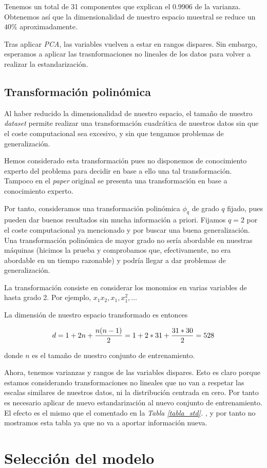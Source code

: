 \documentclass[11pt]{article}
\begin{document}
Tenemos un total de 31 componentes que explican el 0.9906 de la varianza. Obtenemos así que la dimensionalidad de nuestro espacio muestral se reduce un $40\%$ aproximadamente.

Tras aplicar \emph{PCA}, las variables vuelven a estar en rangos dispares. Sin embargo, esperamos a aplicar las trasnformaciones no lineales de los datos para volver a realizar la estandarización. 

\subsection{Transformación polinómica}


Al haber reducido la dimensionalidad de nuestro espacio, el tamaño de nuestro \emph{dataset} permite realizar una transformación cuadrática de nuestros datos sin que el coste computacional sea excesivo, y sin que tengamos problemas de generalización. 

Hemos considerado esta transformación pues no disponemos de conocimiento experto del problema para decidir en base a ello una tal transformación. Tampoco en el \emph{paper} original \cite{original_paper:paper} se presenta una transformación en base a conocimiento experto.

Por tanto, consideramos una transformación polinómica $\phi_q$ de grado $q$ fijado, pues pueden dar buenos resultados sin mucha información a priori. Fijamos $q=2$ por el coste computacional ya mencionado y por buscar una buena generalización. Una transformación polinómica de mayor grado no sería abordable en nuestras máquinas (hicimos la prueba y comprobamos que, efectivamente, no era abordable en un tiempo razonable) y podría llegar a dar problemas de generalización.

La transformación consiste en considerar los monomios en varias variables de hasta grado 2. Por ejemplo, $x_1 x_2, x_1, x_1^2, \ldots$

La dimensión de nuestro espacio transformado es entonces 

$$d = {1+2n}+{{n(n-1)}\over{2}} = {1+2*31}+{{31*30}\over{2}} = 528$$

donde $n$ es el tamaño de nuestro conjunto de entrenamiento.

Ahora, tenemos varianzas y rangos de las variables dispares. Esto es claro porque estamos considerando transformaciones no lineales que no van a respetar las escalas similares de nuestros datos, ni la distribución centrada en cero. Por tanto es necesario aplicar de nuevo estandarización al nuevo conjunto de entrenamiento. El efecto es el mismo que el comentado en la \emph{Tabla \ref{tabla_std}. }, y por tanto no mostramos esta tabla ya que no va a aportar información nueva.

\pagebreak

\section{Selección del modelo} \label{seleccion_modelos}

\pagebreak

\


\end{document}
